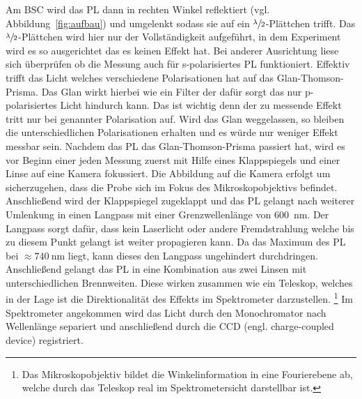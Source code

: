 Am BSC wird das PL dann in rechten Winkel reflektiert (vgl. Abbildung~\ref{fig:aufbau}) und umgelenkt sodass sie 
auf ein $\sfrac{\lambda}{2}$-Plättchen trifft.
Das $\sfrac{\lambda}{2}$-Plättchen wird hier nur der Vollständigkeit aufgeführt, in dem Experiment
wird es so ausgerichtet das es keinen Effekt hat. 
Bei anderer Ausrichtung liese sich überprüfen ob die Messung auch für s-polarisiertes PL
funktioniert.
Effektiv trifft das Licht welches verschiedene Polarisationen hat auf das Glan-Thomson-Prisma.
Das Glan wirkt hierbei wie ein Filter der dafür sorgt das nur p-polarisiertes Licht hindurch kann.
Das ist wichtig denn der zu messende Effekt tritt nur bei genannter Polarisation auf.
Wird das Glan weggelassen, so bleiben die unterschiedlichen Polarisationen erhalten
und es würde nur weniger Effekt messbar sein. 
Nachdem das PL das Glan-Thomson-Prisma passiert hat, wird es vor Beginn einer jeden Messung zuerst
mit Hilfe eines Klappspiegels und einer Linse auf eine Kamera fokussiert. 
Die Abbildung auf die Kamera erfolgt um sicherzugehen, dass die Probe sich im Fokus des 
Mikroskopobjektivs befindet.
Anschließend wird der Klappspiegel zugeklappt und das PL gelangt nach weiterer Umlenkung in einen 
Langpass mit einer Grenzwellenlänge von \SI{600}{\nano\meter}. 
Der Langpass sorgt dafür, dass kein Laserlicht oder andere Fremdstrahlung
welche bis zu diesem Punkt gelangt ist weiter propagieren kann. 
Da das Maximum des PL bei $\approx \SI{740}{\nano\meter}$ liegt, 
kann dieses den Langpass ungehindert durchdringen.
Anschließend gelangt das PL in eine Kombination aus zwei Linsen mit unterschiedlichen Brennweiten.
Diese wirken zusammen wie ein Teleskop, welches in der Lage ist die Direktionalität des Effekts 
im Spektrometer darzustellen.
\footnote{Das Mikroskopobjektiv bildet die Winkelinformation in eine Fourierebene ab,
welche durch das Teleskop real im Spektrometersicht darstellbar ist.} 
Im Spektrometer angekommen wird das Licht durch den Monochromator nach Wellenlänge separiert und 
anschließend durch die CCD (engl. charge-coupled device) registriert.

